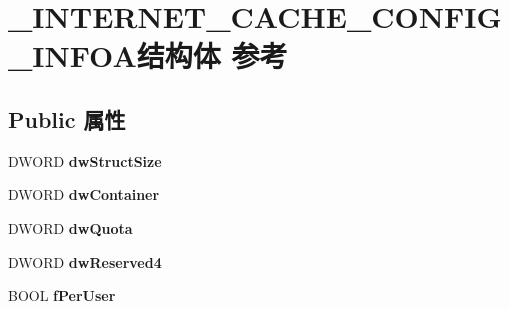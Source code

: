 \hypertarget{struct___i_n_t_e_r_n_e_t___c_a_c_h_e___c_o_n_f_i_g___i_n_f_o_a}{}\section{\+\_\+\+I\+N\+T\+E\+R\+N\+E\+T\+\_\+\+C\+A\+C\+H\+E\+\_\+\+C\+O\+N\+F\+I\+G\+\_\+\+I\+N\+F\+O\+A结构体 参考}
\label{struct___i_n_t_e_r_n_e_t___c_a_c_h_e___c_o_n_f_i_g___i_n_f_o_a}
\subsection*{Public 属性}
\begin{DoxyCompactItemize}
\item 
\mbox{\label{struct___i_n_t_e_r_n_e_t___c_a_c_h_e___c_o_n_f_i_g___i_n_f_o_a_a5b3654dc0d16da1340d46040fecc9bd4}} 
D\+W\+O\+RD {\bfseries dw\+Struct\+Size}
\item 
\mbox{\label{struct___i_n_t_e_r_n_e_t___c_a_c_h_e___c_o_n_f_i_g___i_n_f_o_a_ad0561c93e61a9125c9802066cdcf25d3}} 
D\+W\+O\+RD {\bfseries dw\+Container}
\item 
\mbox{\label{struct___i_n_t_e_r_n_e_t___c_a_c_h_e___c_o_n_f_i_g___i_n_f_o_a_adeabe69c5f715abfd1b6b5960e41c869}} 
D\+W\+O\+RD {\bfseries dw\+Quota}
\item 
\mbox{\label{struct___i_n_t_e_r_n_e_t___c_a_c_h_e___c_o_n_f_i_g___i_n_f_o_a_a5347567dfaaed6a1eec70621221d7ec5}} 
D\+W\+O\+RD {\bfseries dw\+Reserved4}
\item 
\mbox{\label{struct___i_n_t_e_r_n_e_t___c_a_c_h_e___c_o_n_f_i_g___i_n_f_o_a_aedd93d2729e75540488679d578dfbf56}} 
B\+O\+OL {\bfseries f\+Per\+User}
\item 
\mbox{\label{struct___i_n_t_e_r_n_e_t___c_a_c_h_e___c_o_n_f_i_g___i_n_f_o_a_a15e289e452dc131a6ebe0f55304e629a}} 

\end{DoxyCompactItemize}
